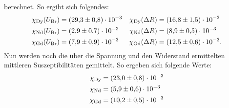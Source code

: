 berechnet.
So ergibt sich folgendes:
\begin{align*}
  \chi_\text{Dy}(U_\text{Br}) &= \SI{29.3\pm0.8e-3}{} & \chi_\text{Dy}(\Delta R) &= \SI{16.8\pm1.5e-3}{}\\
  \chi_\text{Nd}(U_\text{Br}) &= \SI{2.9\pm0.7e-3}{} & \chi_\text{Nd}(\Delta R) &= \SI{8.9\pm0.5e-3}{}\\
  \chi_\text{Gd}(U_\text{Br}) &= \SI{7.9\pm0.9e-3}{} & \chi_\text{Gd}(\Delta R) &= \SI{12.5\pm0.6e-3}{} .
\end{align*}
Nun werden noch die über die Spannung und den Widerstand ermittelten mittleren Suszeptibilitäten gemittelt.
So ergeben sich folgende Werte:
\begin{align*}
  \chi_\text{Dy} &= \SI{23.0\pm0.8e-3}{} \\
  \chi_\text{Nd} &= \SI{5.9\pm0.6e-3}{} \\
  \chi_\text{Gd} &= \SI{10.2\pm0.5e-3}{}
\end{align*}

